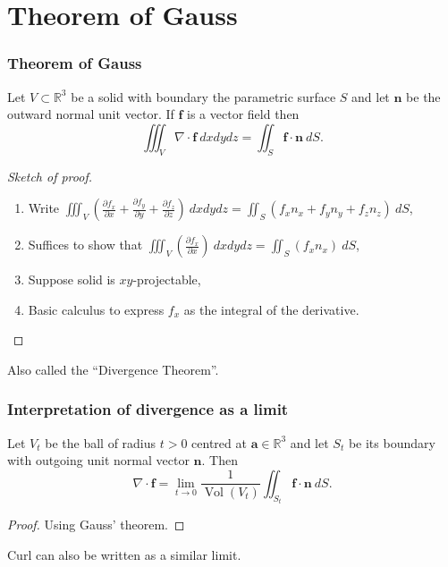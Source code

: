 \documentclass[aspectratio=169]{beamer}
\newcommand{\bR}{\mathbb{R}} %
\renewcommand{\aa}{\mathbf{a}}
\newcommand{\ff}{\mathbf{f}}
\newcommand{\nn}{\mathbf{n}}
\begin{document}
\section{Theorem of Gauss}

\begin{frame}
    \frametitle{Theorem of Gauss}

    \begin{theorem}[Gauss]
        Let \(V \subset \bR^3\) be a solid with boundary the parametric surface \(S\) and let \(\nn\) be the outward normal unit vector.
        If \(\ff\) is a vector field then
        \[
            \iiint_{V} \nabla \cdot \ff \ dxdydz = \iint_{S} \ff \cdot \nn \ dS.
        \]
    \end{theorem}


    \begin{proof}[Sketch of proof]

        \begin{enumerate}
            \item Write \(\iiint_V \left(\frac{\partial f_x}{\partial x} + \frac{\partial f_y}{\partial y} + \frac{\partial f_z}{\partial z} \right) \ dx dy dz = \iint_{S} \left(f_x n_x + f_y n_y + f_z n_z\right) \ dS\),
            \item Suffices to show that \(\iiint_V \left(\frac{\partial f_x}{\partial x}  \right) \ dx dy dz = \iint_{S} \left(f_x n_x \right) \ dS\),
            \item Suppose solid is \(xy\)-projectable,
            \item Basic calculus to express \(f_x\) as the integral of the derivative.
        \end{enumerate}
    \end{proof}

    Also called the ``Divergence Theorem''.


\end{frame}



\begin{frame}
    \frametitle{Interpretation of divergence as a limit}

    \begin{theorem}
        Let \(V_t\) be the ball of radius \(t>0\) centred at \(\aa\in\bR^3\)
        and let \(S_t\) be its boundary with outgoing unit normal vector \(\nn\).
        Then
        \[
            \nabla\cdot \ff = \lim_{t\to 0} \frac{1}{\operatorname{Vol}(V_t)} \iint_{S_t} \ff \cdot \nn \ dS.
        \]
    \end{theorem}

    \begin{proof}
        Using Gauss' theorem.
    \end{proof}

    \vspace{1em}


    Curl can also be written as a similar limit.

\end{frame}
\end{document}
